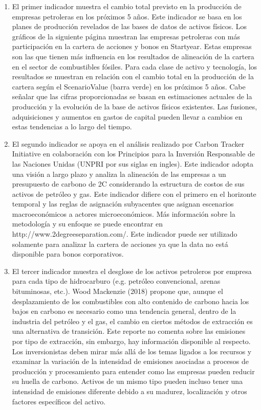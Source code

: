 \documentclass[10pt,table]{article}\usepackage[]{graphicx}\usepackage[]{color}
\begin{document}
\begin{multicols}{2}
		
		\begin{enumerate}
			\item {	El primer indicador muestra el cambio total previsto en la producción de empresas petroleras en los próximos 5 años. Este indicador se basa en los planes de producción revelados de las bases de datos de activos físicos. Los gráficos de la siguiente página muestran las empresas petroleras con más participación en la cartera de acciones y bonos en Startyear. Estas empresas son las que tienen más influencia en los resultados de alineación de la cartera en el sector de combustibles fósiles. Para cada clase de activo y tecnología, los resultados se muestran en relación con el cambio total en la producción de la cartera según el ScenarioValue (barra verde) en los próximos 5 años. Cabe señalar que las cifras proporcionadas se basan en estimaciones actuales de la producción y la evolución de la base de activos físicos existentes.
			Las fusiones, adquisiciones y aumentos en gastos de capital pueden llevar a cambios en estas tendencias a lo largo del tiempo. }
			\item {	El segundo indicador se apoya en el análisis realizado por Carbon Tracker Initiative en colaboración con los Principios para la Inversión Responsable de las Naciones Unidas (UNPRI por sus siglas en ingles). Este indicador adopta una visión a largo plazo y analiza la alineación de las empresas a un presupuesto de carbono de 2\degree C considerando la estructura de costos de sus activos de petróleo y gas. Este indicador difiere con el primero en el horizonte temporal y las reglas de asignación subyacentes que asignan escenarios macroeconómicos a actores microeconómicos. Más información sobre la metodología y su enfoque se puede encontrar en http://www.2degreeseparation.com/. Este indicador puede ser utilizado solamente para analizar la cartera de acciones ya que la data no está disponible para bonos corporativos.}
			\item 	{El tercer indicador muestra el desglose de los activos petroleros por empresa para cada tipo de hidrocarburo (e.g. petróleo convencional, arenas bituminosas, etc.). Wood Mackenzie (2018) propone que, aunque el desplazamiento de los combustibles con alto contenido de carbono hacia los bajos en carbono es necesario como una tendencia general, dentro de la industria del petróleo y el gas, el cambio en ciertos métodos de extracción es una alternativa de transición. Este reporte no comenta sobre las emisiones por tipo de extracción, sin embargo, hay información disponible al respecto. Los inversionistas deben mirar más allá de los temas ligados a los recursos y examinar la variación de la intensidad de emisiones asociadas a procesos de producción y procesamiento para entender como las empresas pueden reducir su huella de carbono. Activos de un mismo tipo pueden incluso tener una intensidad de emisiones diferente debido a su madurez, localización y otros factores específicos del activo.}
		\end{enumerate}
			

\end{multicols}
\end{document}
